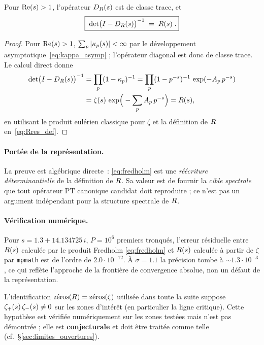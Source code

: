 \begin{theoreme}
\label{thm:fredholm}
Pour $\operatorname{Re}(s) > 1$, l'opérateur $D_R(s)$ est de classe trace, et
\begin{equation}
\boxed{\;\det\!\big(I - D_R(s)\big)^{-1} \;=\; R(s)\;.}
\label{eq:fredholm}
\end{equation}
\end{theoreme}

\begin{proof}
Pour $\operatorname{Re}(s) > 1$, $\sum_p |\kappa_p(s)| < \infty$ par le développement
asymptotique~\eqref{eq:kappa_asymp} ; l'opérateur diagonal est donc de
classe trace. Le calcul direct donne
\begin{align*}
\det\!\big(I - D_R(s)\big)^{-1}
&= \prod_p (1 - \kappa_p)^{-1}
= \prod_p (1 - p^{-s})^{-1}\,\exp(-A_p\,p^{-s})\\
&= \zeta(s)\,\exp\!\Big(-\sum_p A_p\,p^{-s}\Big)
= R(s),
\end{align*}
en utilisant le produit eulérien classique pour $\zeta$ et la définition
de $R$ en~\eqref{eq:Rres_def}.
\end{proof}

\paragraph{Portée de la représentation.}
La preuve est algébrique directe~: \eqref{eq:fredholm} est une
\emph{réécriture déterminantielle} de la définition de $R$. Sa valeur
est de fournir la \emph{cible spectrale} que tout opérateur PT canonique
candidat doit reproduire ; ce n'est pas un argument indépendant pour la
structure spectrale de $R$.

\paragraph{Vérification numérique.}
Pour $s = 1.3 + 14.134725\,i$, $P = 10^{6}$ premiers tronqués, l'erreur
résiduelle entre $R(s)$ calculée par le produit Fredholm
\eqref{eq:fredholm} et $R(s)$ calculée à partir de $\zeta$ par
\texttt{mpmath} est de l'ordre de $2.0 \cdot 10^{-12}$. À $\sigma = 1.1$
la précision tombe à $\sim 1.3 \cdot 10^{-3}$, ce qui reflète l'approche
de la frontière de convergence absolue, non un défaut de la
représentation.

\begin{remarque}
\label{rem:non_annulation}
L'identification $\mathrm{z\acute{e}ros}(R) = \mathrm{z\acute{e}ros}(\zeta)$
utilisée dans toute la suite suppose
$\zeta_{+}(s)\,\zeta_{-}(s) \neq 0$ sur les zones d'intérêt (en
particulier la ligne critique). Cette hypothèse est vérifiée
numériquement sur les zones testées mais n'est pas démontrée ; elle est
\textbf{conjecturale} et doit être traitée comme telle
(cf.~\S\ref{sec:limites_ouvertures}).
\end{remarque}


